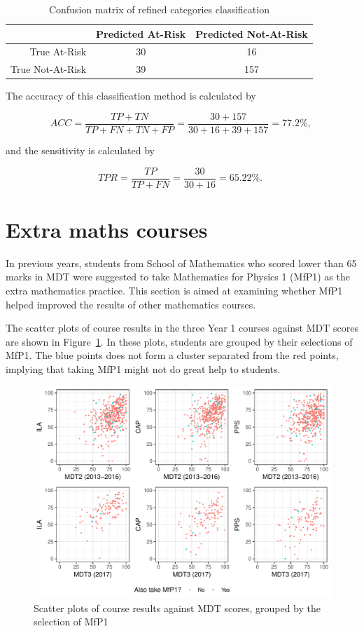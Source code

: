 \documentclass[a4paper]{report}
\begin{document}
\begin{table}[ht]
  \centering
  \begin{tabular}{rcc}
    \hline
   & Predicted At-Risk & Predicted Not-At-Risk \\ 
    \hline
  True At-Risk & 30 & 16 \\ 
    True Not-At-Risk & 39 & 157 \\ 
     \hline
  \end{tabular}
  \caption{\label{tab:REL_cm_NewCat}Confusion matrix of refined categories classification}
\end{table}

The accuracy of this classification method is calculated by 

$$ACC = \frac{TP+TN}{TP+FN+TN+FP} = \frac{30+157}{30+16+39+157} = 77.2\% \text{, }$$

\noindent
and the sensitivity is calculated by 

$$TPR = \frac{TP}{TP+FN} = \frac{30}{30+16} = 65.22\% \text{. }$$

\section{Extra maths courses}

In previous years, students from School of Mathematics who scored lower than 65 marks in MDT were suggested to take Mathematics for Physics 1 (MfP1) as the extra mathematics practice. This section is aimed at examining whether MfP1 helped improved the results of other mathematics courses. 

The scatter plots of course results in the three Year 1 courses against MDT scores are shown in Figure~\ref{fig:REL_scatter_MfP1}. In these plots, students are grouped by their selections of MfP1. The blue points does not form a cluster separated from the red points, implying that taking MfP1 might not do great help to students. 

\begin{figure}[H]
  \centering
  \includegraphics[width=\linewidth]{fig/REL_scatter_MfP1.pdf}
  \caption{\label{fig:REL_scatter_MfP1}Scatter plots of course results against MDT scores, grouped by the selection of MfP1}
\end{figure}
\end{document}
